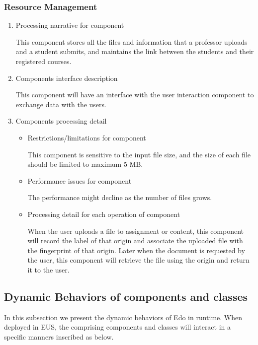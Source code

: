 \documentclass[paper=a4, fontsize=11pt]{scrartcl}
\numberwithin{equation}{section}		%
\numberwithin{figure}{section}			%
\numberwithin{table}{section}				%
\begin{document}
\subsubsection{Resource Management}
\begin{enumerate}
	\item Processing narrative for component
	\par This component stores all the files and information that a professor uploads and a student submits, and maintains the link between the students and their registered courses.
	\item Components interface description
	\par This component will have an interface with the user interaction component to exchange data with the users.
	\item Components processing detail
	\begin{itemize}
		\item Restrictions/limitations for component
		\par This component is sensitive to the input file size, and the size of each file should be limited to maximum 5 MB.
		\item Performance issues for component 
		\par The performance might decline as the number of files grows.
		\item Processing detail for each operation of component 
		\par When the user uploads a file to assignment or content, this component will record the label of that origin and associate the uploaded file with the fingerprint of that origin. Later when the document is requested by the user, this component will retrieve the file using the origin and return it to the user.
	\end{itemize}
\end{enumerate}


\subsection{Dynamic Behaviors of components and classes}
In this subsection we present the dynamic behaviors of Edo in runtime. When deployed in EUS, the comprising components and classes will interact in a specific manners inscribed as below.
\end{document}
